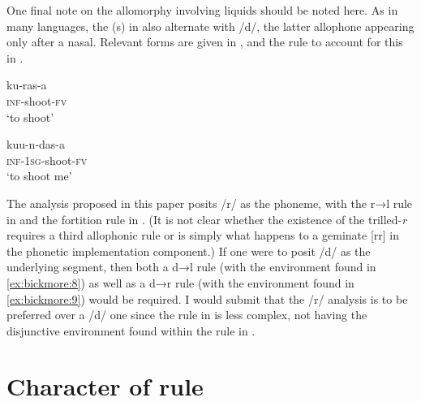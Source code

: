 \documentclass[output=paper,modfonts,nonflat,
colorlinks, citecolor=brown,
draftmode,
]{langsci/langscibook}
\begin{document}
One final note on the allomorphy involving liquids should be noted here. As in many  languages, the (s) in  also alternate with /d/, the latter allophone appearing only after a nasal. Relevant  forms are given in , and the rule to account for this in .

\ea\label{ex:bickmore:24}
\ea\label{ex:bickmore:24a}
\gll ku-ras-a\\
\textsc{inf}-shoot-\textsc{fv}\\
\glt ‘to shoot’

\ex\label{ex:bickmore:24b}
\gll kuu-n-das-a\\
\textsc{inf}-\textsc{1sg}-shoot-\textsc{fv}\\
\glt ‘to shoot me’
\z
\z

\ea\label{ex:bickmore:25}
\z

The analysis proposed in this paper posits /r/ as the phoneme, with the r→l rule in  and the fortition rule in . (It is not clear whether the existence of the trilled-\textit{r} requires a third allophonic rule or is simply what happens to a geminate [rr] in the phonetic implementation component.) If one were to posit /d/ as the underlying segment, then both a d→l rule (with the environment found in \ref{ex:bickmore:8}) as well as a d→r rule (with the environment found in \ref{ex:bickmore:9}) would be required. I would submit that the /r/ analysis is to be preferred over a /d/ one since the rule in  is less complex, not having the disjunctive environment found within the rule in . 

\section{Character of rule}
\end{document}
